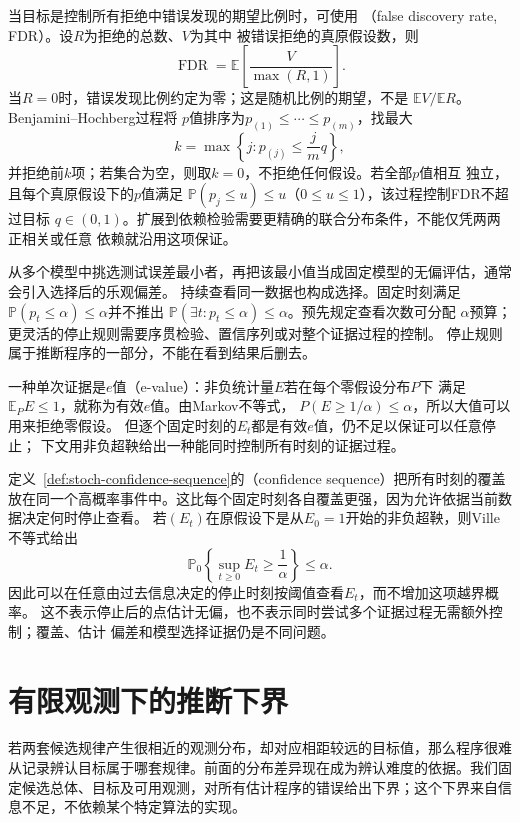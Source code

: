 当目标是控制所有拒绝中错误发现的期望比例时，可使用
（false discovery rate, FDR）。设\(R\)为拒绝的总数、\(V\)为其中
被错误拒绝的真原假设数，则
\[
  \operatorname{FDR}=\mathbb E\left[\frac{V}{\max(R,1)}\right].
\]
当\(R=0\)时，错误发现比例约定为零；这是随机比例的期望，不是
\(\mathbb EV/\mathbb ER\)。Benjamini--Hochberg过程将
\(p\)值排序为\(p_{(1)}\leq\cdots\leq p_{(m)}\)，找最大
\[
  k=\max\left\{j:p_{(j)}\leq\frac{j}{m}q\right\},
\]
并拒绝前\(k\)项；若集合为空，则取\(k=0\)，不拒绝任何假设。若全部\(p\)值相互
独立，且每个真原假设下的\(p\)值满足
\(\mathbb P(p_j\leq u)\leq u\)（\(0\leq u\leq1\)），该过程控制FDR不超过目标
\(q\in(0,1)\)。扩展到依赖检验需要更精确的联合分布条件，不能仅凭两两正相关或任意
依赖就沿用这项保证。

从多个模型中挑选测试误差最小者，再把该最小值当成固定模型的无偏评估，通常会引入选择后的乐观偏差。
持续查看同一数据也构成选择。固定时刻满足
\(\mathbb{P}(p_t\leq\alpha)\leq\alpha\)并不推出
\(\mathbb{P}(\exists t:p_t\leq\alpha)\leq\alpha\)。预先规定查看次数可分配
\(\alpha\)预算；更灵活的停止规则需要序贯检验、置信序列或对整个证据过程的控制。
停止规则属于推断程序的一部分，不能在看到结果后删去。

一种单次证据是\(e\)值（e-value）：非负统计量\(E\)若在每个零假设分布\(P\)下
满足\(\mathbb E_PE\leq1\)，就称为有效\(e\)值。由Markov不等式，
\(P(E\geq1/\alpha)\leq\alpha\)，所以大值可以用来拒绝零假设。
但逐个固定时刻的\(E_t\)都是有效\(e\)值，仍不足以保证可以任意停止；
下文用非负超鞅给出一种能同时控制所有时刻的证据过程。

定义~\ref{def:stoch-confidence-sequence}的（confidence sequence）把所有时刻的覆盖放在同一个高概率事件中。这比每个固定时刻各自覆盖更强，因为允许依据当前数据决定何时停止查看。
若\((E_t)\)在原假设下是从\(E_0=1\)开始的非负超鞅，则Ville不等式给出
\[
  \mathbb{P}_0\left\{\sup_{t\geq0}E_t\geq\frac1\alpha\right\}\leq\alpha.
\]
因此可以在任意由过去信息决定的停止时刻按阈值查看\(E_t\)，而不增加这项越界概率。
这不表示停止后的点估计无偏，也不表示同时尝试多个证据过程无需额外控制；覆盖、估计
偏差和模型选择证据仍是不同问题。

\section{有限观测下的推断下界}
\label{sec:information-lower-bounds}

若两套候选规律产生很相近的观测分布，却对应相距较远的目标值，那么程序很难从记录辨认目标属于哪套规律。前面的分布差异现在成为辨认难度的依据。我们固定候选总体、目标及可用观测，对所有估计程序的错误给出下界；这个下界来自信息不足，不依赖某个特定算法的实现。


